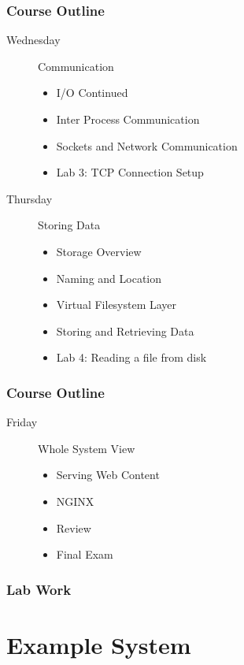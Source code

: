 \documentclass[pdftex]{beamer} %
\begin{document}
\begin{frame}
  \frametitle{Course Outline}
  \begin{description}
  \item[Wednesday] Communication
    \begin{itemize}
    \item I/O Continued
    \item Inter Process Communication
    \item Sockets and Network Communication
    \item Lab 3: TCP Connection Setup
    \end{itemize}
  \item[Thursday] Storing Data
    \begin{itemize}
    \item Storage Overview
    \item Naming and Location
    \item Virtual Filesystem Layer
    \item Storing and Retrieving Data
    \item Lab 4: Reading a file from disk
    \end{itemize}
  \end{description}
\end{frame}

\begin{frame}
  \frametitle{Course Outline}
  \begin{description}
  \item[Friday] Whole System View
    \begin{itemize}
    \item Serving Web Content
    \item NGINX
    \item Review
    \item Final Exam
    \end{itemize}
  \end{description}
\end{frame}

\begin{frame}
  \frametitle{Lab Work}
  \begin{description}
  \item []
  \end{description}
\end{frame}

\section{Example System}
\label{sec:example-system}
\end{document}
